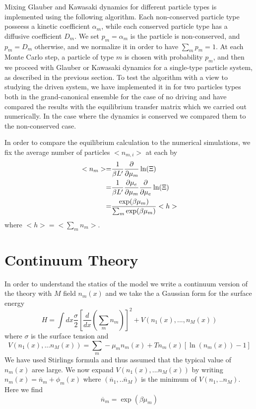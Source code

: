 Mixing Glauber and Kawasaki dynamics for different particle types is implemented using the following algorithm. Each non-conserved particle type posseess a kinetic coefficient $\alpha_m$, while each conserved particle type has a diffusive coefficient $D_m$. We set $p_m = \alpha_m$ is the particle is non-conserved, and $p_m = D_m$ otherwise, and we normalize it in order to have $\sum_m p_m = 1$. At each Monte Carlo step, a particle of type $m$ is chosen with probability $p_m$, and then we proceed with Glauber or Kawasaki dynamics for a single-type particle system, as described in the previous section.
To test the algorithm with a view to studying the driven system, we have implemented it in for two particles types both in the grand-canonical ensemble for the case of no driving and have compared the results with the equilibrium transfer matrix which we carried out numerically. In the case where the dynamics is conserved we compared them to the non-conserved case.

In order to compare the equilibrium calculation to the numerical simulations, we fix the average number of particles $<n_{m,i}>$ at each by
\begin{align}
    < n_m > =& \frac{1}{\beta L'} \frac{\partial}{\partial \mu_m} \ln(\Xi) \nonumber \\
    =& \frac{1}{\beta L'} \frac{\partial \mu_e}{\partial \mu_m} \frac{\partial}{\partial \mu_e} \ln(\Xi) \nonumber \\
    =& \frac{\exp(\beta \mu_m)}{\sum_m \exp(\beta \mu_m)} <h>
\end{align}
where $<h> = <\sum_m n_m>$. 

    \section{Continuum Theory}    

In order to understand the statics of the model we write a continuum version of the theory with $M$ field $n_m(x)$  and we take the a Gaussian form for the surface energy
\begin{equation}
H =  \int dx \frac{\sigma}{2} [\frac{d}{dx} (\sum_m n_m)]^2  + V(n_1(x),...,n_M(x))
\end{equation}
where $\sigma$ is the surface tension and 
\begin{equation}
    V(n_1(x),...n_M(x)) = \sum_m -\mu_m n_m(x) + T n_m(x) [ \ln(n_m(x))-1 ]
\end{equation}
We have used Stirlings formula and thus assumed that the typical value of $n_m(x)$ aree large. 
We now expand $V(n_1(x),...n_M(x))$ by writing $n_m(x) = \overline n_m + \phi_m(x)$  where $(\overline n_1,..\overline n_M)$ is the minimum of $V(n_1,..n_M)$. Here we find
\begin{equation}
    \overline n_m = \exp(\beta \mu_m) 
\end{equation}

